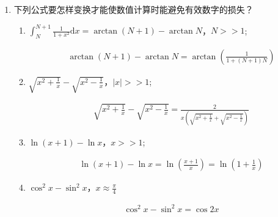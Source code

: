 \documentclass[a4paper]{article}
\begin{document}
\begin{enumerate}
\begin{enumerate}[label=（\arabic*）]
  \end{enumerate}

  \item 下列公式要怎样变换才能使数值计算时能避免有效数字的损失？
  \begin{enumerate}[label=（\arabic*）]
    \item $\int_N^{N+1}\frac{1}{1+x^2}\mathrm{d}x=\arctan(N+1)-\arctan N$，$N>>1$;
    \begin{solution}
      \begin{align*}
        &\arctan(N+1)-\arctan N=\arctan\left(\frac{1}{1+(N+1)N}\right)
      \end{align*}
    \end{solution}
    \item $\sqrt{x^2+\frac{1}{x}}-\sqrt{x^2-\frac{1}{x}}$，$|x|>>1$;
    \begin{solution}
      \begin{align*}
        &\sqrt{x^2+\frac{1}{x}}-\sqrt{x^2-\frac{1}{x}}=\frac{2}{x\left(\sqrt{x^2+\frac{1}{x}}+\sqrt{x^2-\frac{1}{x}}\right)}
      \end{align*}
    \end{solution}
    \item $\ln(x+1)-\ln x$，$x>>1$;
    \begin{solution}
      \begin{align*}
        &\ln(x+1)-\ln x=\ln\left(\frac{x+1}{x}\right)=\ln\left(1+\frac{1}{x}\right)
      \end{align*}
    \end{solution}
    \item $\cos^2x-\sin^2x$，$x\approx\frac{\pi}{4}$
    \begin{solution}
      \begin{align*}
        &\cos^2x-\sin^2x=\cos 2x
      \end{align*}
    \end{solution}
  \end{enumerate}


\end{enumerate}
\end{document}
